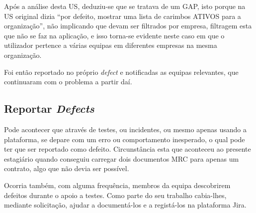                 Após a análise desta US, deduziu-se que se tratava de um GAP, isto porque na US original dizia ``por defeito, mostrar uma lista de carimbos ATIVOS para a organização'', não implicando que devam ser filtrados por empresa, filtragem esta que não se faz na aplicação, e isso torna-se evidente neste caso em que o utilizador pertence a várias equipas em diferentes empresas na mesma organização.

                Foi então reportado no próprio \textit{defect} e notificadas as equipas relevantes, que continuaram com o problema a partir daí.


    \subsection{Reportar \textit{Defects}}\label{sub:reportar_defects}

        Pode acontecer que através de testes, ou incidentes, ou mesmo apenas usando a plataforma, se depare com um erro ou comportamento inesperado, o qual pode ter que ser reportado como defeito. Circunstância esta que aconteceu ao presente estagiário quando conseguiu carregar dois documentos MRC para apenas um contrato, algo que não devia ser possível. 
        
        Ocorria também, com alguma frequência, membros da equipa descobrirem defeitos durante o apoio a testes. Como parte do seu trabalho cabia-lhes, mediante solicitação,  
        ajudar a documentá-los e a registá-los na plataforma Jira.

